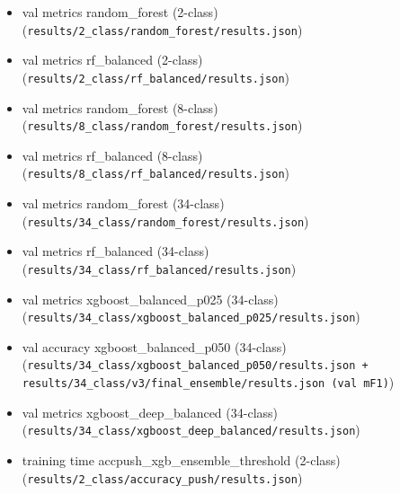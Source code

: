 \begin{itemize}\footnotesize
\item val metrics random\_forest (2-class) (\texttt{results/2\_class/random\_forest/results.json})
\item val metrics rf\_balanced (2-class) (\texttt{results/2\_class/rf\_balanced/results.json})
\item val metrics random\_forest (8-class) (\texttt{results/8\_class/random\_forest/results.json})
\item val metrics rf\_balanced (8-class) (\texttt{results/8\_class/rf\_balanced/results.json})
\item val metrics random\_forest (34-class) (\texttt{results/34\_class/random\_forest/results.json})
\item val metrics rf\_balanced (34-class) (\texttt{results/34\_class/rf\_balanced/results.json})
\item val metrics xgboost\_balanced\_p025 (34-class) (\texttt{results/34\_class/xgboost\_balanced\_p025/results.json})
\item val accuracy xgboost\_balanced\_p050 (34-class) (\texttt{results/34\_class/xgboost\_balanced\_p050/results.json + results/34\_class/v3/final\_ensemble/results.json (val mF1)})
\item val metrics xgboost\_deep\_balanced (34-class) (\texttt{results/34\_class/xgboost\_deep\_balanced/results.json})
\item training time accpush\_xgb\_ensemble\_threshold (2-class) (\texttt{results/2\_class/accuracy\_push/results.json})
\end{itemize}
